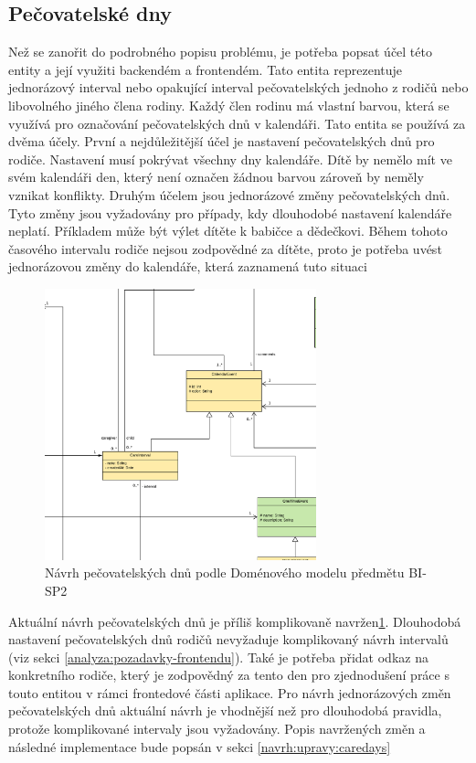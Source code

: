         \subsection{Pečovatelské dny}\label{analyza:pozadavky:caredays}
            Než se zanořit do podrobného popisu problému, je potřeba popsat účel této entity a její využiti backendém a frontendém. Tato entita reprezentuje jednorázový interval nebo opakující interval pečovatelských jednoho z rodičů nebo libovolného jiného člena rodiny. Každý člen rodinu má vlastní barvou, která se využívá pro označování pečovatelských dnů v kalendáři. Tato entita se používá za dvěma účely. První a nejdůležitější účel je nastavení pečovatelských dnů pro rodiče. Nastavení musí pokrývat všechny dny kalendáře. Dítě by nemělo mít ve svém kalendáři den, který není označen žádnou barvou zároveň by neměly vznikat konflikty. Druhým účelem jsou jednorázové změny pečovatelských dnů. Tyto změny jsou vyžadovány pro případy, kdy dlouhodobé nastavení kalendáře neplatí. Příkladem může být výlet dítěte k babičce a dědečkovi. Během tohoto časového intervalu rodiče nejsou zodpovědné za dítěte, proto je potřeba uvést jednorázovou změny do kalendáře, která zaznamená tuto situaci 
            
            \begin{figure}\centering
	            \includegraphics[width=0.7\textwidth]{pdfs/CareDays1}
	            \caption[Návrh pečovatelských dnů]{Návrh pečovatelských dnů podle Doménového modelu předmětu BI-SP2}\label{image:caredays1}
            \end{figure}
            Aktuální návrh pečovatelských dnů je příliš komplikovaně navržen\ref{image:caredays1}. Dlouhodobá nastavení pečovatelských dnů rodičů nevyžaduje komplikovaný návrh intervalů (viz sekci \ref{analyza:pozadavky-frontendu}). Také je potřeba přidat odkaz na konkretního rodiče, který je zodpovědný za tento den pro zjednodušení práce s touto entitou v rámci frontedové části aplikace. Pro návrh jednorázových změn pečovatelských dnů aktuální návrh je vhodnější než pro dlouhodobá pravidla, protože komplikované intervaly jsou vyžadovány. Popis navržených změn a následné implementace bude popsán v sekci \ref{navrh:upravy:caredays}
            
